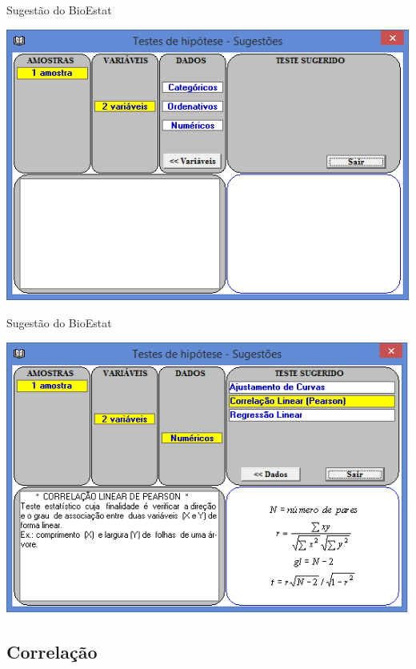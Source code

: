 \documentclass{beamer}
\begin{document}
\begin{frame}{Sugestão do BioEstat}
  \begin{center}
    \includegraphics[height=0.9\textheight]{sugestao3}
  \end{center}
\end{frame}

\begin{frame}{Sugestão do BioEstat}
  \begin{center}
    \includegraphics[height=0.9\textheight]{sugestao4}
  \end{center}
\end{frame}

\subsection{Correlação}
\end{document}
